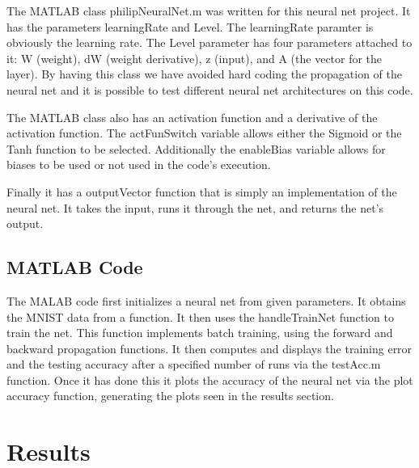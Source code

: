 \documentclass[12pt]{article}
\begin{document}
	The MATLAB class philipNeuralNet.m was written for this neural net project. It has the parameters learningRate and Level. The learningRate paramter is obviously the learning rate. The Level parameter has four parameters attached to it: W (weight), dW (weight derivative),  z (input), and A (the vector for the layer). By having this class we have avoided hard coding the propagation of the neural net and it is possible to test different neural net architectures on this code. \par 
	
	The MATLAB class also has an activation function and a derivative of the activation function. The actFunSwitch variable allows either the Sigmoid or the Tanh function to be selected. Additionally the enableBias variable allows for biases to be used or not used in the code's execution. \par 
	Finally it has a outputVector function that is simply an implementation of the neural net. It takes the input, runs it through the net, and returns the net's output. \par 
	
	\subsection{MATLAB Code}
	The MALAB code first initializes a neural net from given parameters. It obtains the MNIST data from a function\cite{usingMNIST}. It then uses the handleTrainNet function to train the net. This function implements batch training, using the forward and backward propagation functions. It then computes and displays the training error and the testing accuracy after a specified number of runs via the testAcc.m function. Once it has done this it plots the accuracy of the neural net via the plot accuracy function, generating the plots seen in the results section.
	 
	
	
	\section{Results}
\end{document}

